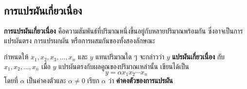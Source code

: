 \subsection{การแปรผันเกี่ยวเนื่อง}
\textbf{การแปรผันเกี่ยวเนื่อง} คือความสัมพันธ์ที่ปริมาณหนึ่งขึ้นอยู่กับหลายปริมาณพร้อมกัน ซึ่งอาจเป็นการแปรผันตรง การแปรผกผัน หรือการผสมกันของทั้งสองลักษณะ 

\begin{definitionbox}\label{definition1.3}
กำหนดให้ $x_1, x_2, x_3, \ldots, x_n$ และ $y$ แทนปริมาณใด ๆ  
จะกล่าวว่า $y$ \textbf{แปรผันเกี่ยวเนื่อง} กับ $x_1, x_2, \ldots, x_n$  
เมื่อ $y$ แปรผันตรงกับผลคูณของปริมาณเหล่านั้น เขียนได้เป็น
\[
y = \alpha x_1 x_2 \cdots x_n
\]
โดยที่ $\alpha$ เป็นค่าคงตัวและ $\alpha \neq 0$ เรียก $\alpha$ ว่า \textbf{ค่าคงตัวของการแปรผัน}
\end{definitionbox}

